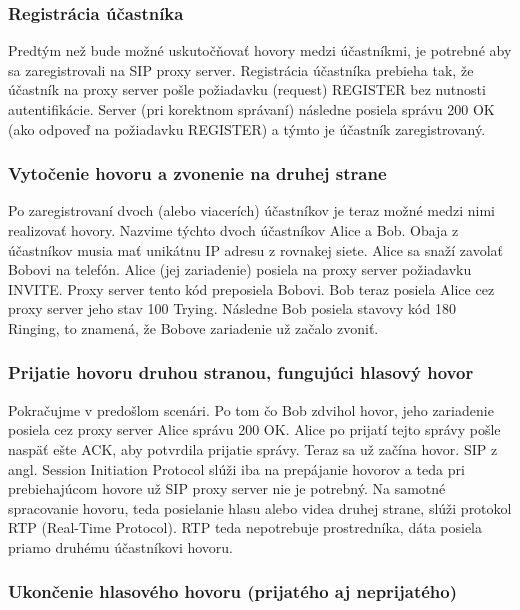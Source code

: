 \subsubsection{Registrácia účastníka}

Predtým než bude možné uskutočňovať hovory medzi účastníkmi, je potrebné aby sa zaregistrovali na SIP proxy server. Registrácia účastníka prebieha tak, že účastník na proxy server pošle požiadavku (request) REGISTER bez nutnosti autentifikácie. Server (pri korektnom správaní) následne posiela správu 200 OK (ako odpoveď na požiadavku REGISTER) a týmto je účastník zaregistrovaný.

\subsubsection{Vytočenie hovoru a zvonenie na druhej strane}

Po zaregistrovaní dvoch (alebo viacerích) účastníkov je teraz možné medzi nimi realizovať hovory. Nazvime týchto dvoch účastníkov Alice a Bob. Obaja z účastníkov musia mať unikátnu IP adresu z rovnakej siete. Alice sa snaží zavolať Bobovi na telefón. Alice (jej zariadenie) posiela na proxy server požiadavku INVITE. Proxy server tento kód preposiela Bobovi. Bob teraz posiela Alice cez proxy server jeho stav 100 Trying. Následne Bob posiela stavovy kód 180 Ringing, to znamená, že Bobove zariadenie už začalo zvoniť. 

\subsubsection{Prijatie hovoru druhou stranou, fungujúci hlasový hovor}

Pokračujme v predošlom scenári. Po tom čo Bob zdvihol hovor, jeho zariadenie posiela cez proxy server Alice správu 200 OK. Alice po prijatí tejto správy pošle naspäť ešte ACK, aby potvrdila prijatie správy. Teraz sa už začína hovor. SIP z angl. Session Initiation Protocol slúži iba na prepájanie hovorov a teda pri prebiehajúcom hovore už SIP proxy server nie je potrebný. Na samotné spracovanie hovoru, teda posielanie hlasu alebo videa druhej strane, slúži protokol RTP (Real-Time Protocol). RTP teda nepotrebuje prostredníka, dáta posiela priamo druhému účastníkovi hovoru.

\subsubsection{Ukončenie hlasového hovoru (prijatého aj neprijatého)}

